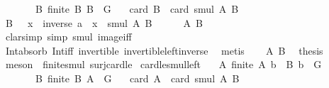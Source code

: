 \begin{isabellebody}
\ \ \ \ \ \ \ B{\isacharcolon}{\kern0pt}\ {\isachardoublequoteopen}finite\ B{\isachardoublequoteclose}\ {\isachardoublequoteopen}B\ {\isasymsubseteq}\ G{\isachardoublequoteclose}\isanewline
\ \ \ {\isachardoublequoteopen}card\ B\ {\isasymle}\ card\ {\isacharparenleft}{\kern0pt}smul\ A\ B{\isacharparenright}{\kern0pt}{\isachardoublequoteclose}\isanewline
%
\isadelimproof
%
\endisadelimproof
%
\isatagproof
{}\isamarkupfalse%
\ {\isacharminus}{\kern0pt}\isanewline
\ \ \isamarkupfalse%
\ {\isachardoublequoteopen}B\ {\isasymsubseteq}\ {\isacharparenleft}{\kern0pt}{\isasymlambda}\ x{\isachardot}{\kern0pt}\ \ {\isacharparenleft}{\kern0pt}inverse\ a{\isacharparenright}{\kern0pt}\ {\isasymcdot}\ x{\isacharparenright}{\kern0pt}\ {\isacharbackquote}{\kern0pt}\ smul\ A\ B{\isachardoublequoteclose}\isanewline
\ \ \ \ \isamarkupfalse%
\ A\ B\isanewline
\ \ \ \ \isamarkupfalse%
\ {\isacharparenleft}{\kern0pt}clarsimp\ simp{\isacharcolon}{\kern0pt}\ smul\ image{\isacharunderscore}{\kern0pt}iff{\isacharparenright}{\kern0pt}\isanewline
\ \ \ \ \isamarkupfalse%
\ Int{\isacharunderscore}{\kern0pt}absorb{}\ Int{\isacharunderscore}{\kern0pt}iff\ invertible\ invertible{\isacharunderscore}{\kern0pt}left{\isacharunderscore}{\kern0pt}inverse{}\ \isamarkupfalse%
\ metis\isanewline
\ \ \isamarkupfalse%
\ A\ B\ \isamarkupfalse%
\ {\isacharquery}{\kern0pt}thesis\isanewline
\ \ \ \ \isamarkupfalse%
\ {\isacharparenleft}{\kern0pt}meson\ \ finite{\isacharunderscore}{\kern0pt}smul\ surj{\isacharunderscore}{\kern0pt}card{\isacharunderscore}{\kern0pt}le{\isacharparenright}{\kern0pt}\isanewline
{}\isamarkupfalse%
%
\endisatagproof
{\isafoldproof}%
%
\isadelimproof
\isanewline
%
\endisadelimproof
\isanewline
{}\isamarkupfalse%
\ card{\isacharunderscore}{\kern0pt}le{\isacharunderscore}{\kern0pt}smul{\isacharunderscore}{\kern0pt}left{\isacharcolon}{\kern0pt}\isanewline
\ \ \ A{\isacharcolon}{\kern0pt}\ {\isachardoublequoteopen}finite\ A{\isachardoublequoteclose}\ {\isachardoublequoteopen}b\ {\isasymin}\ B{\isachardoublequoteclose}\ {\isachardoublequoteopen}b\ {\isasymin}\ G{\isachardoublequoteclose}\isanewline
\ \ \ \ \ \ \ B{\isacharcolon}{\kern0pt}\ {\isachardoublequoteopen}finite\ B{\isachardoublequoteclose}\ {\isachardoublequoteopen}A\ {\isasymsubseteq}\ G{\isachardoublequoteclose}\isanewline
\ \ \ {\isachardoublequoteopen}card\ A\ {\isasymle}\ card\ {\isacharparenleft}{\kern0pt}smul\ A\ B{\isacharparenright}{\kern0pt}{\isachardoublequoteclose}\isanewline

\end{isabellebody}
